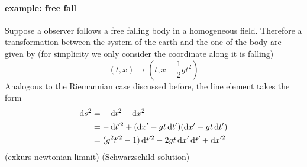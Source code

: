 \paragraph{example: free fall}
Suppose a observer follows a free falling body in a homogeneous field. 
Therefore a transformation between the system of the earth and the one of the body are given by 
(for simplicity we only consider the coordinate along it is falling)
\begin{equation}
    (t,x)\to\left(t,x-\frac{1}{2}gt^2\right)
\end{equation}
Analogous to the Riemannian case discussed before, the line element takes the form
\begin{align*}
    \dif s^2&=-\dif t^2 +\dif x^2\\
    &=-\dif t'^2+(\dif x'- gt\dif t')(\dif x'- gt\dif t')\\
    &=(g^2t'^2-1)\dif t'^2-2gt\dif x'\dif t'+\dif x'^2\\
\end{align*}
(exkurs newtonian limnit)
(Schwarzschild solution)